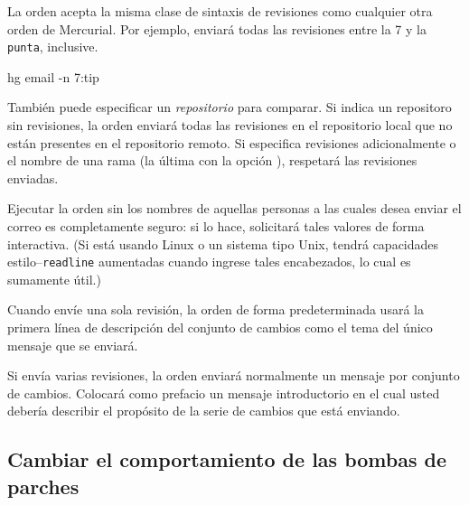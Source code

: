 La orden  acepta la misma clase de sintaxis
de revisiones como cualquier otra orden de Mercurial.  Por ejemplo,
enviará todas las revisiones entre la 7 y la \texttt{punta}, inclusive.
\begin{codesample2}
  hg email -n 7:tip
\end{codesample2}
También puede especificar un \emph{repositorio} para comparar.  Si
indica un repositoro sin revisiones, la orden 
enviará todas las revisiones en el repositorio local que no están
presentes en el repositorio remoto.  Si especifica revisiones
adicionalmente o el nombre de una rama (la última con la opción
), respetará las revisiones enviadas.

Ejecutar la orden  sin los nombres de
aquellas personas a las cuales desea enviar el correo es completamente
seguro: si lo hace, solicitará tales valores de forma interactiva.
(Si está usando Linux o un sistema tipo Unix, tendrá capacidades
estilo--\texttt{readline} aumentadas cuando ingrese tales encabezados,
lo cual es sumamente útil.)

Cuando envíe una sola revisión, la orden 
de forma predeterminada usará la primera línea de descripción del
conjunto de cambios como el tema del único mensaje que se enviará.

Si envía varias revisiones, la orden  enviará
normalmente un mensaje por conjunto de cambios. Colocará como
prefacio un mensaje introductorio en el cual usted debería describir
el propósito de la serie de cambios que está enviando.

\subsection{Cambiar el comportamiento de las bombas de parches}


